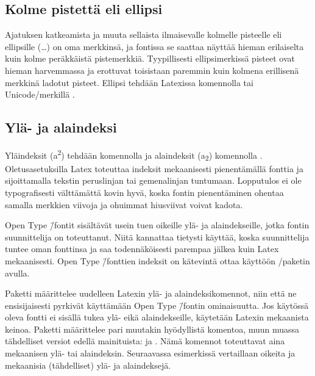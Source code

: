 
\subsection{Kolme pistettä eli ellipsi}

Ajatuksen katkeamista ja muuta sellaista ilmaisevalle kolmelle pisteelle
eli ellipsille (\ldots) on oma merkkinsä, ja fontissa se saattaa näyttää
hieman erilaiselta kuin kolme peräkkäistä pistemerkkiä. Tyypillisesti
ellipsimerkissä pisteet ovat hieman harvemmassa ja erottuvat toisistaan
paremmin kuin kolmena erillisenä merkkinä ladotut pisteet. Ellipsi
tehdään Latexissa komennolla  tai Unicode\-/merkillä
.

\subsection{Ylä- ja alaindeksi}

Yläindeksit (a\textsuperscript{2}) tehdään komennolla  ja alaindeksit (a\textsubscript{2}) komennolla
. Oletus\-asetuksilla Latex toteuttaa
indeksit mekaanisesti pienentämällä fonttia ja sijoittamalla tekstin
peruslinjan tai gemenalinjan tuntumaan. Lopputulos ei ole typografisesti
välttämättä kovin hyvä, koska fontin pienentäminen ohentaa samalla
merkkien viivoja ja ohuimmat hiusviivat voivat kadota.

Open Type \=/fontit sisältävät usein tuen oikeille ylä- ja
alaindekseille, jotka fontin suunnittelija on toteuttanut. Niitä
kannattaa tietysti käyttää, koska suunnittelija tuntee oman fonttinsa ja
saa todennäköisesti parempaa jälkea kuin Latex mekaanisesti. Open Type
\=/fonttien indeksit on kätevintä ottaa käyttöön
\-/paketin avulla.

\begin{koodilohkosis}
  \usepackage{realscripts}
\end{koodilohkosis}

Paketti  määrittelee uudelleen Latexin ylä- ja
alaindeksikomennot, niin että ne ensisijaisesti pyrkivät käyttämään Open
Type \=/fontin ominaisuutta. Jos käytössä oleva fontti ei sisällä tukea
ylä- eikä alaindekseille, käytetään Latexin mekaanista keinoa. Paketti
määrittelee pari muutakin hyödyllistä komentoa, muun muassa tähdelliset
versiot edellä mainituista:  ja
. Nämä komennot toteuttavat aina
mekaanisen ylä- tai alaindeksin. Seuraavassa esimerkissä vertaillaan
oikeita ja mekaanisia (tähdelliset) ylä- ja alaindeksejä.

